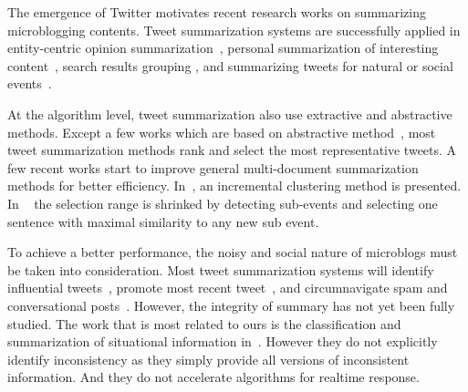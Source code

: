 \documentclass[envcountsame]{llncs}
\begin{document}


The emergence of Twitter motivates recent research works on summarizing microblogging contents. Tweet summarization systems are successfully applied in entity-centric opinion summarization~\cite{Meng2012Entitycentric}, personal summarization of interesting content~\cite{Ren2013Personalized,Chin2017TOTEM}, search results grouping \cite{Mathioudakis2010TwitterMonitor}, and summarizing tweets for natural or social events~\cite{Takamura2011Summarizing,Lin2012Generating,Rudra2015Extracting,Shou2013Sumblr,Liu2016LEDS,Gillani2017Post,Zubiaga2012Towards}.

At the algorithm level, tweet summarization also use extractive and abstractive methods. Except a few works which are based on abstractive method~\cite{Sharifi2010Summarizing}, most tweet summarization methods rank and select the most representative tweets. A few recent works start to improve general multi-document summarization methods for better efficiency. In~\cite{Shou2013Sumblr}, an incremental clustering method is presented. In ~\cite{Zubiaga2012Towards} the selection range is shrinked by detecting sub-events and selecting one sentence with maximal similarity to any new sub event.

To achieve a better performance, the noisy and social nature of microblogs must be taken into consideration. Most tweet summarization systems will identify influential tweets~\cite{Hannon2010Recommending},  promote most recent tweet~\cite{Efron2011Estimation}, and circumnavigate spam and conversational posts~\cite{Gillani2017Post}. However, the integrity of summary has not yet been fully studied. The work that is most related to ours is the
classification and summarization of situational information in~\cite{Rudra2015Extracting,Rudra2016Summarizing}. However they do not explicitly identify inconsistency as they simply provide all versions of inconsistent information. And they do not accelerate algorithms for realtime response.
\end{document}
